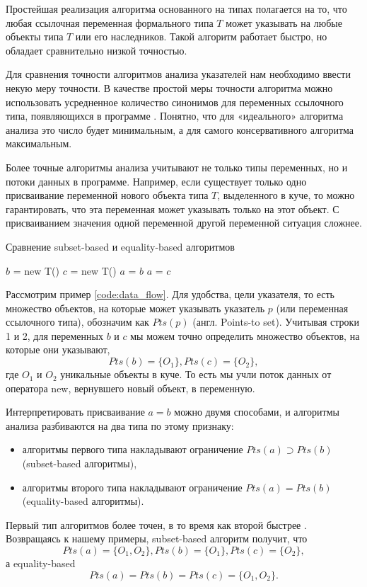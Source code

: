 \documentclass[14pt,titlepage]{extarticle}
\newcommand{\eng}[1]{{\English#1}}
\begin{document}
    Простейшая реализация алгоритма основанного на типах полагается на то, что
    любая ссылочная переменная формального типа $T$ может указывать на любые
    объекты типа $T$ или его наследников. Такой алгоритм работает быстро,
    но обладает сравнительно низкой точностью.

    Для сравнения точности алгоритмов анализа указателей нам необходимо ввести
    некую меру точности. В качестве простой меры точности алгоритма можно
    использовать усредненное количество синонимов для переменных ссылочного
    типа, появляющихся в программе \cite{hind_pointer_analysis_not_solved_yet}.
    Понятно, что для «идеального» алгоритма анализа это число будет
    минимальным, а для самого консервативного алгоритма максимальным.

    Более точные алгоритмы анализа учитывают не только типы переменных,
    но и потоки данных в программе. Например, если существует только
    одно присваивание переменной нового объекта типа $T$, выделенного в куче,
    то можно гарантировать, что эта переменная может указывать только
    на этот объект.
    С присваиванием значения одной переменной другой переменной ситуация
    сложнее.
    \begin{algorithm}
      \caption{Сравнение \eng{subset-based} и \eng{equality-based} алгоритмов}
      \label{code:data_flow}
      \begin{algorithmic}[1]
        \STATE $b$ = new T()
        \STATE $c$ = new T()
        \STATE $a$ = $b$
        \STATE $a$ = $c$
      \end{algorithmic}
    \end{algorithm}
    Рассмотрим пример \ref{code:data_flow}.
    Для удобства, цели указателя, то есть множество объектов, на которые может
    указывать указатель $p$ (или переменная ссылочного типа), обозначим как
    $Pts(p)$ (англ. \eng{Points-to set}).
    Учитывая строки 1 и 2, для переменных $b$ и $c$ мы можем точно определить
    множество объектов, на которые они указывают,
    \[Pts(b) = \{O_1\}, Pts(c) = \{O_2\},\] где $O_1$ и $O_2$ уникальные
    объекты в куче. То есть мы учли поток данных от оператора new,
    вернувшего новый объект, в переменную.

    Интерпретировать присваивание $a = b$ можно двумя способами,
    и алгоритмы анализа разбиваются на два типа по этому признаку:
    \begin{itemize}
      \item алгоритмы первого типа накладывают ограничение
            $Pts(a) \supset Pts(b)$ (\eng{subset-based} алгоритмы),
      \item алгоритмы второго типа накладывают ограничение
            $Pts(a) = Pts(b)$ (\eng{equality-based} алгоритмы).
    \end{itemize}
    Первый тип алгоритмов более точен, в то время как второй быстрее
    \cite{steensgaard}. Возвращаясь к нашему примеры, \eng{subset-based}
    алгоритм получит, что
    \[Pts(a) = \{O_1, O_2\}, Pts(b) = \{O_1\}, Pts(c) = \{O_2\},\]
    а \eng{equality-based}
    \[Pts(a) = Pts(b) = Pts(c) = \{O_1, O_2\}.\]
\end{document}
